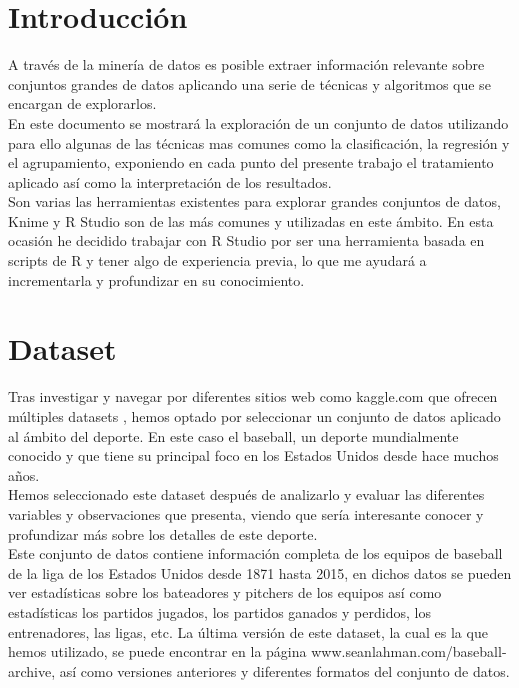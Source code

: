 \documentclass[10pt]{article}
\begin{document}
\newpage																		

\tableofcontents 

\newpage


\section{Introducción} 

A través de la minería de datos es posible extraer información relevante sobre conjuntos grandes de datos aplicando una serie de técnicas y algoritmos que se encargan de explorarlos.\\


En este documento se mostrará la exploración de un conjunto de datos utilizando para ello algunas de las técnicas mas comunes como la clasificación, la regresión y el agrupamiento, exponiendo en cada punto del presente trabajo el tratamiento aplicado así como la interpretación de los resultados. \\

Son varias las herramientas existentes para explorar grandes conjuntos de datos, Knime y R Studio son de las más comunes y utilizadas en este ámbito. En esta ocasión he decidido trabajar con R Studio por ser una herramienta basada en scripts de R y tener algo de experiencia previa, lo que me ayudará a incrementarla y profundizar en su conocimiento. \\

\section{Dataset} 

Tras investigar y navegar por diferentes sitios web como kaggle.com que ofrecen múltiples datasets , hemos optado por seleccionar un conjunto de datos aplicado al ámbito del deporte. En este caso el baseball, un deporte mundialmente conocido y que tiene su principal foco en los Estados Unidos desde hace muchos años.\\

Hemos seleccionado este dataset después de analizarlo y evaluar las diferentes variables y observaciones que presenta, viendo que sería interesante conocer y profundizar más sobre los detalles de este deporte. \\

Este conjunto de datos contiene información completa de los equipos de baseball de la liga de los Estados Unidos desde 1871 hasta 2015, en dichos datos se pueden ver estadísticas sobre los bateadores y pitchers de los equipos así como estadísticas los partidos jugados, los partidos ganados y perdidos, los entrenadores, las ligas, etc.  La última versión de este dataset, la cual es la que hemos utilizado, se puede encontrar en la página www.seanlahman.com/baseball-archive, así como versiones anteriores y diferentes formatos del conjunto de datos.\\
\end{document}
